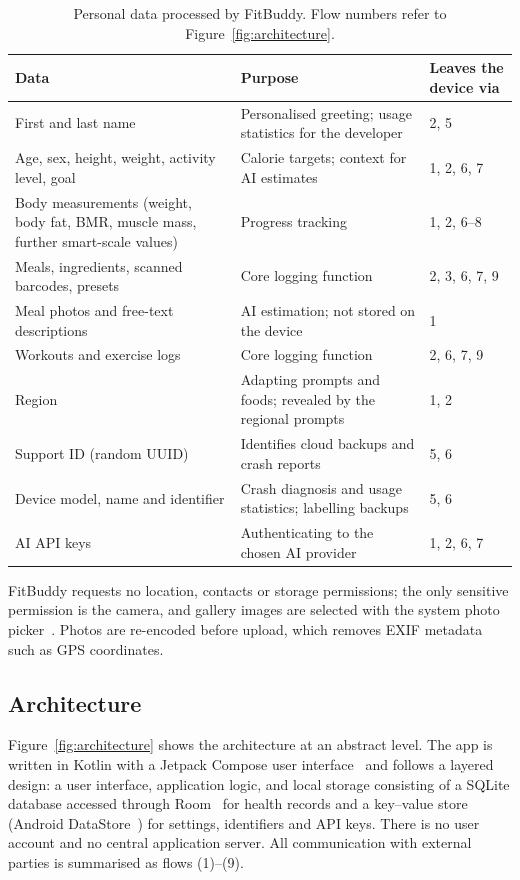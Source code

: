 \documentclass[a4paper,12pt]{article}
\begin{document}
\begin{table}[htbp]
\centering
\footnotesize
\caption{Personal data processed by FitBuddy. Flow numbers refer to Figure~\ref{fig:architecture}.}
\label{tab:data}
\begin{tabularx}{\textwidth}{@{}L L l@{}}
\toprule
\textbf{Data} & \textbf{Purpose} & \textbf{Leaves the device via} \\
\midrule
First and last name & Personalised greeting; usage statistics for the developer & 2, 5 \\
Age, sex, height, weight, activity level, goal & Calorie targets; context for AI estimates & 1, 2, 6, 7 \\
Body measurements (weight, body fat, BMR, muscle mass, further smart-scale values) & Progress
  tracking & 1, 2, 6--8 \\
Meals, ingredients, scanned barcodes, presets & Core logging function & 2, 3, 6, 7, 9 \\
Meal photos and free-text descriptions & AI estimation; not stored on the device & 1 \\
Workouts and exercise logs & Core logging function & 2, 6, 7, 9 \\
Region & Adapting prompts and foods; revealed by the regional prompts & 1, 2 \\
Support ID (random UUID) & Identifies cloud backups and crash reports & 5, 6 \\
Device model, name and identifier & Crash diagnosis and usage statistics; labelling backups & 5, 6 \\
AI API keys & Authenticating to the chosen AI provider & 1, 2, 6, 7 \\
\bottomrule
\end{tabularx}
\end{table}

FitBuddy requests no location, contacts or storage permissions; the only sensitive permission is
the camera, and gallery images are selected with the system photo picker~\cite{android-photopicker}.
Photos are re-encoded before upload, which removes EXIF metadata such as GPS coordinates.

\subsection{Architecture}
Figure~\ref{fig:architecture} shows the architecture at an abstract level. The app is written in
Kotlin with a Jetpack Compose user interface~\cite{android-compose} and follows a layered design:
a user interface, application logic, and local storage consisting of a SQLite database accessed
through Room~\cite{android-room} for health records and a key--value store (Android
DataStore~\cite{android-datastore}) for settings, identifiers and API keys. There is no user
account and no central application server. All communication with external parties is
summarised as flows (1)--(9).
\end{document}
